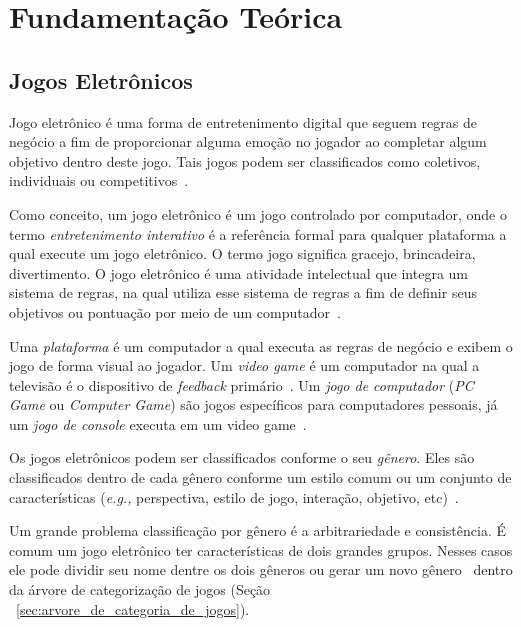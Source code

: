 \chapter{Fundamentação Teórica}
\label{cap2}

\section{Jogos Eletrônicos}



Jogo eletrônico é uma forma de entretenimento digital que seguem regras de negócio a fim de proporcionar alguma emoção no jogador ao completar algum objetivo dentro deste jogo.
%
Tais jogos podem ser classificados como coletivos, individuais ou competitivos~\cite{video_game_technologies}.



Como conceito, um jogo eletrônico é um jogo controlado por computador, onde o termo \textit{entretenimento interativo} é a referência formal para qualquer plataforma a qual execute um jogo eletrônico.
%
O termo jogo significa gracejo, brincadeira, divertimento. O jogo eletrônico é uma atividade intelectual que integra um sistema de regras, na qual utiliza esse sistema de regras a fim de definir seus objetivos ou pontuação por meio de um computador~\cite{video_game_technologies}.



Uma \textit{plataforma} é um computador a qual executa as regras de negócio e exibem o jogo de forma visual ao jogador. Um \textit{video game} é um computador na qual a televisão é o dispositivo de \textit{feedback} primário~\cite{video_game_technologies}.
%
Um \textit{jogo de computador} (\textit{PC Game} ou \textit{Computer Game}) são jogos específicos para computadores pessoais, já um \textit{jogo de console} executa em um video game~\cite{video_game_technologies}.



Os jogos eletrônicos podem ser classificados conforme o seu \textit{gênero}.
%
Eles são classificados dentro de cada gênero conforme um estilo comum ou um conjunto de características (\textit{e.g.,} perspectiva, estilo de jogo, interação, objetivo, etc)~\cite{video_game_technologies}.



Um grande problema classificação por gênero é a arbitrariedade e consistência.
%
É comum um jogo eletrônico ter características de dois grandes grupos.
%
Nesses casos ele pode dividir seu nome dentre os dois gêneros ou gerar um novo gênero~\cite{video_game_technologies} dentro da árvore de categorização de jogos (Seção ~\ref{sec:arvore_de_categoria_de_jogos}).



